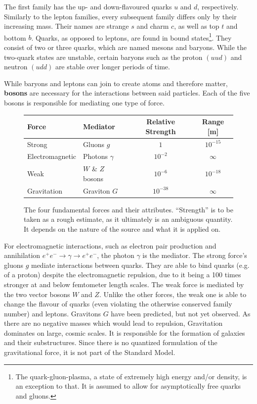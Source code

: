 The first family has the up- and down-flavoured quarks $u$ and $d$, respectively. Similarly to the lepton families, every subsequent family differs only by their increasing mass. Their names are strange $s$ and charm $c$, as well as top $t$ and bottom $b$. Quarks, as opposed to leptons, are found in bound states\footnote{The quark-gluon-plasma, a state of extremely high energy and/or density, is an exception to that. It is assumed to allow for asymptotically free quarks and gluons.}. They consist of two or three quarks, which are named mesons and baryons. While the two-quark states are unstable, certain baryons such as the proton $(uud)$ and neutron $(udd)$ are stable over longer periods of time.


While baryons and leptons can join to create atoms and therefore matter, \textbf{bosons} are necessary for the interactions between said particles. Each of the five bosons is responsible for mediating one type of force.

\begin{figure}[!htb]
  \centering
  \begin{tabular}{|l|l|c|c|}
    \hline
    Force           & Mediator          & Relative Strength & Range [m]  \\ \hline
    Strong          & Gluons $g$        & $1$               & $10^{-15}$ \\
    Electromagnetic & Photons $\gamma$  & $10^{-2}$         & $\infty$   \\
    Weak            & $W$ \& $Z$ bosons & $10^{-6}$         & $10^{-18}$ \\
    Gravitation     & Graviton $G$      & $10^{-38}$        & $\infty$   \\
    \hline  
  \end{tabular}
  \caption{The four fundamental forces and their attributes. ``Strength'' is to be taken as a rough estimate, as it ultimately is an ambiguous quantity. It depends on the nature of the source and what it is applied on.}
  \label{tab:fundforces}
\end{figure}

For electromagnetic interactions, such as electron pair production and annihilation $e^+ e^- \rightarrow \gamma \rightarrow e^+ e^-$, the photon $\gamma$ is the mediator. The strong force's gluons $g$ mediate interactions between quarks. They are able to bind quarks (e.g. of a proton) despite the electromagnetic repulsion, due to it being a 100 times stronger at and below femtometer length scales. The weak force is mediated by the two vector bosons $W$ and $Z$. Unlike the other forces, the weak one is able to change the flavour of quarks (even violating the otherwise conserved family number) and leptons. Gravitons $G$ have been predicted, but not yet observed. As there are no negative masses which would lead to repulsion, Gravitation dominates on large, cosmic scales. It is responsible for the formation of galaxies and their substructures. Since there is no quantized formulation of the gravitational force, it is not part of the Standard Model.

